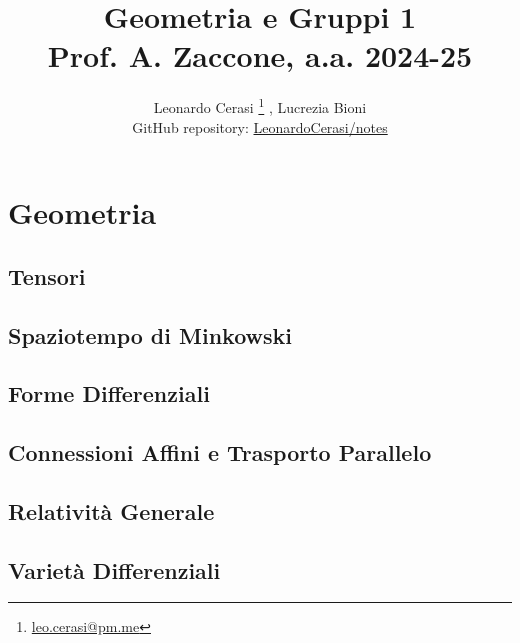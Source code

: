 \documentclass[a4paper, 12pt, openany]{book}
\author{Leonardo Cerasi%
	\thanks{\scriptsize\href{mailto:leonardo.cerasi@studenti.unimi.it}{leo.cerasi@pm.me}}%
	, Lucrezia Bioni\\
	\small GitHub repository: \href{https://github.com/LeonardoCerasi/notes}{LeonardoCerasi/notes}}
\title{\Huge\textbf{Geometria e Gruppi 1} \\ \large Prof. A. Zaccone, a.a. 2024-25}
\begin{document}
\frontmatter

\maketitle

\tableofcontents
\pagestyle{indice}

\mainmatter

\part{Geometria}
\pagestyle{body}

\chapter{Tensori}


\chapter{Spaziotempo di Minkowski}


\chapter{Forme Differenziali}


\chapter{Connessioni Affini e Trasporto Parallelo}


\chapter{Relatività Generale}


\chapter{Varietà Differenziali}

\end{document}
